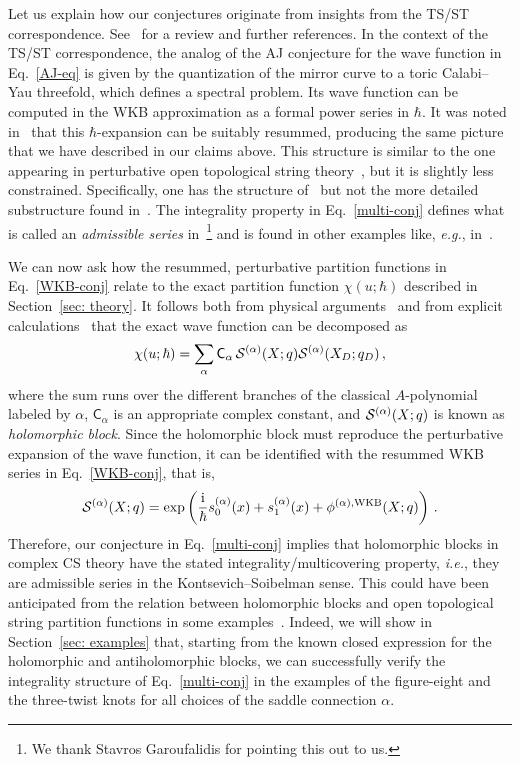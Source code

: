 \documentclass[a4paper,11pt]{article}
\theoremstyle{definition}
\newcommand{\CS}{{\cal S}}
\newcommand{\ri}{{\rm i}}
\newcommand{\mC}{\mathsf{C}}
\newcommand{\be}{\begin{equation}}
\newcommand{\ee}{\end{equation}}
\begin{document}
Let us explain how our conjectures originate from insights from the TS/ST correspondence. See~\cite{mmrev} for a review and further references. In the context of the TS/ST correspondence, the analog of the AJ conjecture for the wave function in Eq.~\eqref{AJ-eq} is given by the quantization of the mirror curve to a toric Calabi--Yau threefold, which defines a spectral problem. Its wave function can be computed in 
the WKB approximation as a formal power series in $\hbar$. It was noted in~\cite{kpamir, mz-wv} that this $\hbar$-expansion can be suitably resummed, producing the same picture that we have described in our claims above. This structure is similar to the one appearing in perturbative open topological string theory~\cite{ov, lmv}, but it is slightly less constrained. Specifically, one has the structure of~\cite{ov} but not the more detailed substructure found in~\cite{lmv}. The integrality property in Eq.~\eqref{multi-conj} defines what is called an {\it admissible series} in~\cite{ks}\footnote{We thank Stavros Garoufalidis for pointing this out to us.} and is found in other examples like, {\it e.g.}, in~\cite{as}. 

We can now ask how the resummed, perturbative partition functions in Eq.~\eqref{WKB-conj} relate to the exact partition function $\chi(u;\hbar)$ described in Section~\ref{sec: theory}. 
It follows both from physical arguments~\cite{bdp} and from explicit calculations~\cite{gk-qseries, dimofte-levelk, ggm2} that the 
exact wave function can be decomposed as
%
\be \label{exactconj}
\chi(u; \hbar)=\sum_{\alpha} \mC_\alpha \, \CS^{(\alpha)} (X; q)\CS^{(\alpha)} (X_D;q_D) \, , 
\ee
%
where the sum runs over the different branches of the classical $A$-polynomial labeled by $\alpha$, $\mC_\alpha$ 
is an appropriate complex constant, and $\CS^{(\alpha)} (X; q)$ is known as {\it holomorphic block}. 
Since the holomorphic block must reproduce the perturbative expansion of the wave function, it can be identified with the resummed WKB series in Eq.~\eqref{WKB-conj}, that is, 
%
\be \label{block-resummed}
\CS^{(\alpha)} (X; q) = \exp \left(\frac{\ri}{\hbar} s^{(\alpha)}_0(x) +  s^{(\alpha)}_1(x) + \phi^{(\alpha), \rm{WKB}}(X;q)\right) \, .
\ee
%
Therefore, our conjecture in Eq.~\eqref{multi-conj} implies that holomorphic blocks in complex CS theory have the stated integrality/multicovering property, {\it i.e.}, they are admissible series in the Kontsevich--Soibelman sense. This could have been anticipated from the relation between holomorphic blocks and open topological string partition functions in some examples~\cite{bdp}. 
Indeed, we will show in Section~\ref{sec: examples} that, starting from the known closed expression for the holomorphic and antiholomorphic blocks, we can successfully verify the integrality structure of Eq.~\eqref{multi-conj} in the examples of the figure-eight and the three-twist knots for all choices of the saddle connection $\alpha$. 
\end{document}
